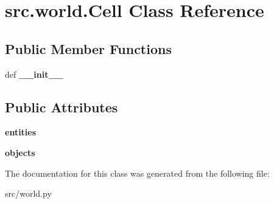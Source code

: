 \hypertarget{classsrc_1_1world_1_1_cell}{\section{src.\-world.\-Cell \-Class \-Reference}
\label{classsrc_1_1world_1_1_cell}
}
\subsection*{\-Public \-Member \-Functions}
\begin{DoxyCompactItemize}
\item 
\hypertarget{classsrc_1_1world_1_1_cell_aff5434421d050215d7610716a2da4cba}{def {\bfseries \-\_\-\-\_\-init\-\_\-\-\_\-}}\label{classsrc_1_1world_1_1_cell_aff5434421d050215d7610716a2da4cba}

\end{DoxyCompactItemize}
\subsection*{\-Public \-Attributes}
\begin{DoxyCompactItemize}
\item 
\hypertarget{classsrc_1_1world_1_1_cell_a496918852843c4e7cc880f94aada21ec}{{\bfseries entities}}\label{classsrc_1_1world_1_1_cell_a496918852843c4e7cc880f94aada21ec}

\item 
\hypertarget{classsrc_1_1world_1_1_cell_af304dc75039bf819e4fca168f74ac0c7}{{\bfseries objects}}\label{classsrc_1_1world_1_1_cell_af304dc75039bf819e4fca168f74ac0c7}

\end{DoxyCompactItemize}


\-The documentation for this class was generated from the following file\-:\begin{DoxyCompactItemize}
\item 
src/world.\-py\end{DoxyCompactItemize}

